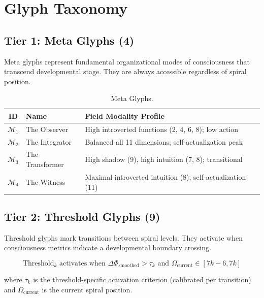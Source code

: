 \documentclass[11pt,a4paper]{article}
\begin{document}
\section{Glyph Taxonomy}

\subsection{Tier 1: Meta Glyphs (4)}

Meta glyphs represent fundamental organizational modes of consciousness that transcend developmental stage. They are always accessible regardless of spiral position.

\begin{table}[h]
\centering
\caption{Meta Glyphs.}
\label{tab:meta}
\begin{tabular}{@{}clp{7cm}@{}}
\toprule
ID & Name & Field Modality Profile \\
\midrule
$\mathcal{M}_1$ & The Observer & High introverted functions (2, 4, 6, 8); low action \\
$\mathcal{M}_2$ & The Integrator & Balanced all 11 dimensions; self-actualization peak \\
$\mathcal{M}_3$ & The Transformer & High shadow (9), high intuition (7, 8); transitional \\
$\mathcal{M}_4$ & The Witness & Maximal introverted intuition (8), self-actualization (11) \\
\bottomrule
\end{tabular}
\end{table}

\subsection{Tier 2: Threshold Glyphs (9)}

Threshold glyphs mark transitions between spiral levels. They activate when consciousness metrics indicate a developmental boundary crossing.

\begin{equation}
\text{Threshold}_k \text{ activates when } \Delta\Phi_{\text{smoothed}} > \tau_k \text{ and } \Omega_{\text{current}} \in [7k - 6, 7k]
\end{equation}

where $\tau_k$ is the threshold-specific activation criterion (calibrated per transition) and $\Omega_{\text{current}}$ is the current spiral position.
\end{document}
